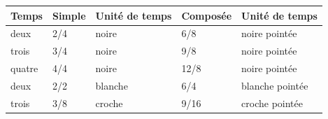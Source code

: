 \begin{tabular}{@{}l l l l l@{}}
\toprule
\textbf{Temps} & \textbf{Simple} & \textbf{Unité de temps} & \textbf{Composée} & \textbf{Unité de temps} \\
\midrule
deux & 2/4 & noire & 6/8 & noire pointée \\
trois & 3/4 & noire & 9/8 & noire pointée \\
quatre & 4/4 & noire & 12/8 & noire pointée \\
deux & 2/2 & blanche & 6/4 & blanche pointée \\
trois & 3/8 & croche & 9/16 & croche pointée \\
\bottomrule
\end{tabular}
